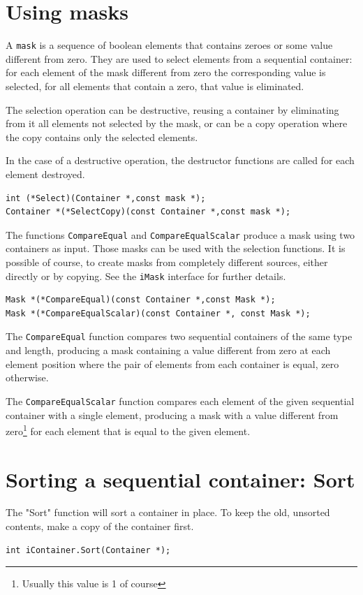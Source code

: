 \documentclass[12pt,a4paper]{memoir} %
\begin{document}
\section{Using masks}
A \verb,mask, is a sequence of boolean elements that contains zeroes or some value different from zero. They are used to select elements from a sequential container: for each element of the mask different from zero the corresponding value is selected, for all elements that contain a zero, that value is eliminated.

The selection operation can be destructive, reusing a container by eliminating from it all elements not selected by the mask, or can be a copy operation where the copy contains only the selected elements.

In the case of a destructive operation, the destructor functions are called for each element destroyed.
\begin{verbatim}
int (*Select)(Container *,const mask *);
Container *(*SelectCopy)(const Container *,const mask *);
\end{verbatim}

The functions \verb,CompareEqual, and \verb,CompareEqualScalar, produce a mask using two containers as input. Those masks can be used with the selection functions. It is possible of course, to create masks from completely different sources, either directly or by copying. See the \verb,iMask, interface for further details.

\begin{verbatim}
Mask *(*CompareEqual)(const Container *,const Mask *);
Mask *(*CompareEqualScalar)(const Container *, const Mask *);
\end{verbatim}


The \verb,CompareEqual, function compares two sequential containers of the same type and length, producing a mask containing a value different from zero at each element position where the pair of elements from each container is equal, zero otherwise.

The \verb,CompareEqualScalar, function compares each element of the given sequential container with a single element, producing a mask with a value 
different from zero\footnote{Usually this value is 1 of course} for each element that is equal to the given element.
\section{Sorting a sequential container: Sort}
The "Sort" function will sort a container in place. To keep the old, unsorted contents, make a copy of the container first.
\begin{verbatim}
int iContainer.Sort(Container *);
\end{verbatim}
\end{document}
